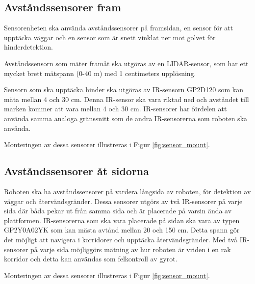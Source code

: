 \documentclass[a4paper,titlepage,12pt]{article}
\begin{document}
	\subsection{Avståndssensorer fram}
	
	Sensorenheten ska använda avståndssensorer på framsidan, en sensor för att
	upptäcka väggar och en sensor som är snett vinklat ner mot golvet för hinderdetektion. 

	Avståndssensorn som mäter framåt ska utgöras av en LIDAR-sensor, som har
    ett mycket brett mätspann (0-40 m) med 1 centimeters upplösning.

	Sensorn som ska upptäcka hinder ska utgöras av IR-sensorn GP2D120 som kan mäta mellan 
	4 och 30 cm. Denna IR-sensor ska vara riktad ned och avståndet till marken kommer 
	att vara mellan 4 och 30 cm. IR-sensorer har fördelen att använda samma analoga gränssnitt 
	som de andra IR-sensorerna som roboten ska använda. 

    Monteringen av dessa sensorer illustreras i Figur \ref{fig:sensor_mount}.

	\subsection{Avståndssensorer åt sidorna}
	Roboten ska ha avståndssensorer på vardera långsida av roboten, för
	detektion av väggar och återvändsgränder. Dessa sensorer utgörs av två 
    IR-sensorer på varje sida där båda pekar ut från samma sida och
	är placerade på varsin ända av plattformen. IR-sensorerna som ska vara placerade 
	på sidan ska vara av typen GP2Y0A02YK som kan mästa avtånd mellan 20 och 150 cm. 
	Detta spann gör det möjligt att navigera i korridorer och upptäcka 
	återvändsgränder. Med två IR-sensorer på varje sida möjliggörs mätning av hur 
	roboten är vriden i en rak korridor och detta kan användas som felkontroll av gyrot.

    Monteringen av dessa sensorer illustreras i Figur \ref{fig:sensor_mount}.
\end{document}
